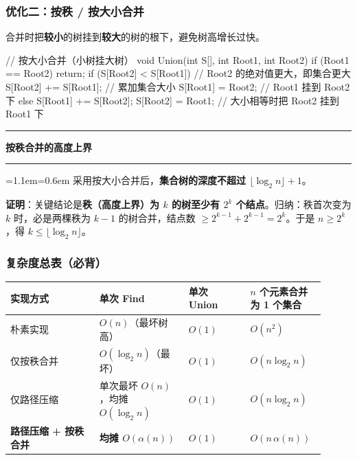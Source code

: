 \documentclass[11pt,openany,UTF8]{ctexbook}
\newcommand{\callouthead}[2]{%
  \par\addvspace{7pt}\noindent
  {\color{#1}\rule[-0.15em]{3pt}{1.05em}}\hspace{0.5em}%
  {\bfseries\color{#1}#2}\par\nobreak\vspace{-0.35em}%
  {\color{rulesep}\hrule height 0.4pt}\nobreak\vspace{0.45em}%
  \begingroup\small\setlength{\parindent}{0pt}%
  \leftskip=1.1em\rightskip=0.6em\noindent\ignorespaces}
\newcommand{\calloutend}{\par\endgroup\addvspace{7pt}}
\newenvironment{callkey}[1]{\callouthead{keybar}{#1}}{\calloutend}
\begin{document}
\subsubsection{优化二：按秩 / 按大小合并}

合并时把\textbf{较小}的树挂到\textbf{较大}的树的根下，避免树高增长过快。

\begin{codebox}
// 按大小合并（小树挂大树）
void Union(int S[], int Root1, int Root2) {
    if (Root1 == Root2) return;
    if (S[Root2] < S[Root1]) {      // Root2 的绝对值更大，即集合更大
        S[Root2] += S[Root1];       // 累加集合大小
        S[Root1] = Root2;           // Root1 挂到 Root2 下
    } else {
        S[Root1] += S[Root2];
        S[Root2] = Root1;           // 大小相等时把 Root2 挂到 Root1 下
    }
}
\end{codebox}

\begin{callkey}{按秩合并的高度上界}
采用按大小合并后，\textbf{集合树的深度不超过 $\lfloor\log_2 n\rfloor+1$}。

\textbf{证明}：关键结论是\textbf{秩（高度上界）为 $k$ 的树至少有 $2^k$ 个结点}。归纳：秩首次变为 $k$ 时，必是两棵秩为 $k-1$ 的树合并，结点数 $\ge2^{k-1}+2^{k-1}=2^k$。于是 $n\ge2^k$，得 $k\le\lfloor\log_2 n\rfloor$。

\end{callkey}

\subsubsection{复杂度总表（必背）}

\begingroup\small\setlength{\tabcolsep}{4.0pt}
\begin{longtable}{@{}L{0.2697\linewidth}L{0.2697\linewidth}L{0.1860\linewidth}L{0.1860\linewidth}@{}}
\toprule
\textbf{实现方式} & \textbf{单次 Find} & \textbf{单次 Union} & \textbf{$n$ 个元素合并为 1 个集合} \\
\midrule
\endhead
朴素实现 & $O(n)$（最坏树高） & $O(1)$ & $O(n^2)$ \\
仅按秩合并 & $O(\log_2 n)$（最坏） & $O(1)$ & $O(n\log_2 n)$ \\
仅路径压缩 & 单次最坏 $O(n)$，均摊 $O(\log_2 n)$ & $O(1)$ & $O(n\log_2 n)$ \\
\textbf{路径压缩 + 按秩合并} & \textbf{均摊 $O(\alpha(n))$} & $O(1)$ & $O(n\,\alpha(n))$ \\
\bottomrule
\end{longtable}
\endgroup
\end{document}
